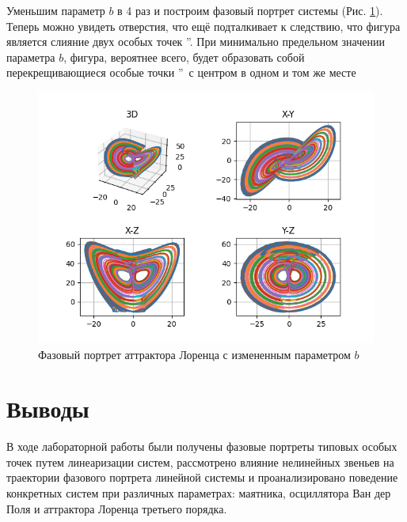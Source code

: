 Уменьшим параметр $b$ в 4 раз и построим фазовый портрет системы (Рис. \ref{fig:27}). 
Теперь можно увидеть отверстия, что ещё подталкивает к следствию, что фигура является слияние двух особых точек \textquotedblright.
При минимально предельном значении параметра $b$, фигура, вероятнее всего, будет образовать собой перекрещивающиеся особые точки
\textquotedblright\ с центром в одном и том же месте

\begin{figure}[H]
	\centering
	\includegraphics[width=0.6\linewidth]{body/images/Lorenz-attractor-type-4.png}
	\caption{Фазовый портрет аттрактора Лоренца с измененным параметром $b$}
	\label{fig:27}
\end{figure}

\section{Выводы}
В ходе лабораторной работы были получены фазовые портреты типовых особых точек
путем линеаризации систем, рассмотрено влияние нелинейных звеньев на траектории фазового портрета линейной системы
и проанализировано поведение конкретных систем при различных параметрах: 
маятника, осциллятора Ван дер Поля и аттрактора Лоренца третьего порядка.